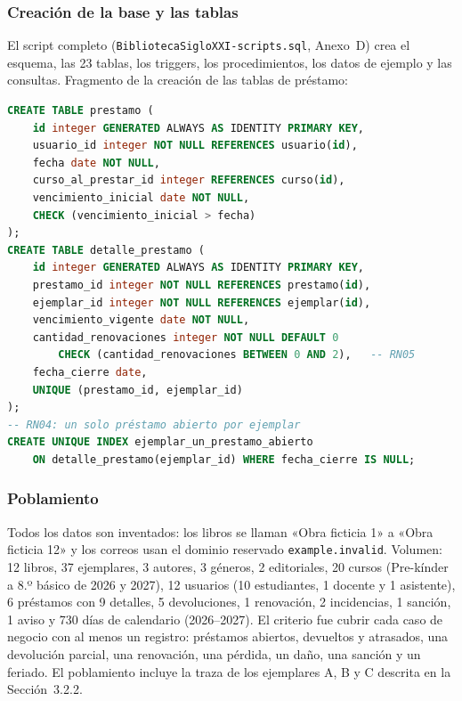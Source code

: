 \documentclass[11pt,a4paper]{article}
\begin{document}
\subsubsection{Creación de la base y las tablas}
El script completo (\texttt{BibliotecaSigloXXI-scripts.sql}, Anexo~D) crea el esquema, las 23 tablas, los triggers, los procedimientos, los datos de ejemplo y las consultas. Fragmento de la creación de las tablas de préstamo:
\begin{lstlisting}[language=SQL]
CREATE TABLE prestamo (
    id integer GENERATED ALWAYS AS IDENTITY PRIMARY KEY,
    usuario_id integer NOT NULL REFERENCES usuario(id),
    fecha date NOT NULL,
    curso_al_prestar_id integer REFERENCES curso(id),
    vencimiento_inicial date NOT NULL,
    CHECK (vencimiento_inicial > fecha)
);
CREATE TABLE detalle_prestamo (
    id integer GENERATED ALWAYS AS IDENTITY PRIMARY KEY,
    prestamo_id integer NOT NULL REFERENCES prestamo(id),
    ejemplar_id integer NOT NULL REFERENCES ejemplar(id),
    vencimiento_vigente date NOT NULL,
    cantidad_renovaciones integer NOT NULL DEFAULT 0
        CHECK (cantidad_renovaciones BETWEEN 0 AND 2),   -- RN05
    fecha_cierre date,
    UNIQUE (prestamo_id, ejemplar_id)
);
-- RN04: un solo préstamo abierto por ejemplar
CREATE UNIQUE INDEX ejemplar_un_prestamo_abierto
    ON detalle_prestamo(ejemplar_id) WHERE fecha_cierre IS NULL;
\end{lstlisting}

\subsubsection{Poblamiento}
Todos los datos son inventados: los libros se llaman «Obra ficticia 1» a «Obra ficticia 12» y los correos usan el dominio reservado \texttt{example.invalid}. Volumen: 12 libros, 37 ejemplares, 3 autores, 3 géneros, 2 editoriales, 20 cursos (Pre-kínder a 8.º básico de 2026 y 2027), 12 usuarios (10 estudiantes, 1 docente y 1 asistente), 6 préstamos con 9 detalles, 5 devoluciones, 1 renovación, 2 incidencias, 1 sanción, 1 aviso y 730 días de calendario (2026--2027). El criterio fue cubrir cada caso de negocio con al menos un registro: préstamos abiertos, devueltos y atrasados, una devolución parcial, una renovación, una pérdida, un daño, una sanción y un feriado. El poblamiento incluye la traza de los ejemplares A, B y C descrita en la Sección~3.2.2.
\end{document}
